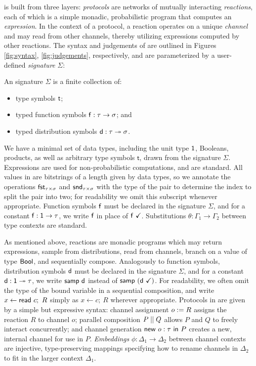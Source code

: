 \ipdl is built from three layers: \emph{protocols} are networks of
mutually interacting \emph{reactions}, each of which is a simple monadic, probabilistic program that computes an \emph{expression}. In the context of a protocol, a reaction operates on a unique \emph{channel} and may read from other channels, thereby utilizing expressions computed by other reactions. The syntax and judgements of \ipdl are outlined in Figures \ref{fig:syntax}, \ref{fig:judgements}, respectively, and are parameterized by a user-defined \emph{signature} $\Sigma$:

\begin{definition}[Signature]
An \ipdl signature $\Sigma$ is a finite collection of:
\begin{itemize}
\item type symbols $\mathsf{t}$;
\item typed function symbols $\mathsf{f} : \tau \rightarrow \sigma$; and
\item typed distribution symbols $\mathsf{d} : \tau \twoheadrightarrow \sigma$.
\end{itemize}
\end{definition}

We have a minimal set of data types, including the unit type $\mathsf{1}$, Booleans, products, as well as arbitrary type symbols $\mathsf{t}$, drawn from the signature $\Sigma$. Expressions are used for non-probabilistic computations, and are standard. All values in \ipdl are bitstrings of a length given by data types, so we annotate the operations $\mathsf{fst}_{\tau \times \sigma}$ and $\mathsf{snd}_{\tau \times \sigma}$ with the type of the pair to determine the index to split the pair into two; for readability we omit this subscript whenever appropriate. Function symbols $\mathsf{f}$ must be declared in the signature $\Sigma$, and for a constant $\mathsf{f} : \mathsf{1} \rightarrow \tau$, we write $\mathsf{f}$ in place of $\mathsf{f} \ \checkmark$. Substitutions $\theta : \Gamma_1 \to \Gamma_2$ between type contexts are standard.

As mentioned above, reactions are monadic programs which may return expressions, sample from distributions, read from channels, branch on a value of type $\mathsf{Bool}$, and sequentially compose. Analogously to function symbols, distribution symbols $\mathsf{d}$ must be declared in the signature $\Sigma$, and for a constant $\mathsf{d} : \mathsf{1} \twoheadrightarrow \tau$, we write $\mathsf{samp} \ \mathsf{d}$ instead of $\mathsf{samp} \ (\mathsf{d} \ \checkmark)$. For readability, we often omit the type of the bound variable in a sequential composition, and write $x \leftarrow \mathsf{read} \ c; \ R$ simply as $x \leftarrow c; \ R$ wherever appropriate. Protocols in \ipdl are given by a simple but expressive syntax: channel assignment $o := R$ assigns the reaction $R$ to channel $o$; parallel composition $P \; || \; Q$ allows $P$ and $Q$ to freely interact concurrently; and channel generation $\mathsf{new} \ o : \tau \ \mathsf{in} \ P$ creates a new, internal channel for use in $P$. \emph{Embeddings} $\phi : \Delta_1 \to \Delta_2$ between channel contexts are injective, type-preserving mappings specifying how to rename channels in $\Delta_2$ to fit in the larger context $\Delta_1$.

